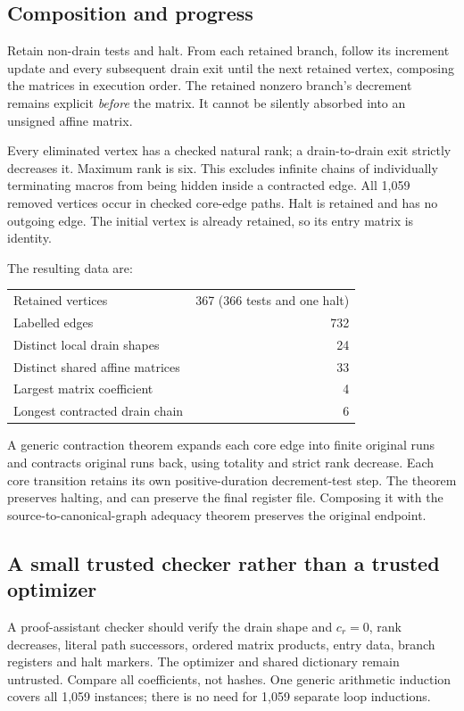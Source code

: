 \documentclass[11pt]{article}
\begin{document}
\subsection{Composition and progress}
Retain non-drain tests and halt. From each retained branch, follow its increment update and every subsequent drain exit until the next retained vertex, composing the matrices in execution order. The retained nonzero branch's decrement remains explicit \emph{before} the matrix. It cannot be silently absorbed into an unsigned affine matrix.

Every eliminated vertex has a checked natural rank; a drain-to-drain exit strictly decreases it. Maximum rank is six. This excludes infinite chains of individually terminating macros from being hidden inside a contracted edge. All 1,059 removed vertices occur in checked core-edge paths. Halt is retained and has no outgoing edge. The initial vertex is already retained, so its entry matrix is identity.

The resulting data are:
\begin{center}
\begin{tabular}{lr}
\toprule
Retained vertices & 367 (366 tests and one halt)\\
Labelled edges & 732\\
Distinct local drain shapes & 24\\
Distinct shared affine matrices & 33\\
Largest matrix coefficient & 4\\
Longest contracted drain chain & 6\\
\bottomrule
\end{tabular}
\end{center}
A generic contraction theorem expands each core edge into finite original runs and contracts original runs back, using totality and strict rank decrease. Each core transition retains its own positive-duration decrement-test step. The theorem preserves halting, and can preserve the final register file. Composing it with the source-to-canonical-graph adequacy theorem preserves the original endpoint.

\subsection{A small trusted checker rather than a trusted optimizer}
A proof-assistant checker should verify the drain shape and $c_r=0$, rank decreases, literal path successors, ordered matrix products, entry data, branch registers and halt markers. The optimizer and shared dictionary remain untrusted. Compare all coefficients, not hashes. One generic arithmetic induction covers all 1,059 instances; there is no need for 1,059 separate loop inductions.
\end{document}
